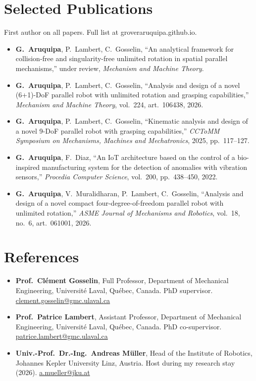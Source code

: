 \documentclass[10pt,letterpaper]{article}
\begin{document}
\section{Selected Publications}
{\small First author on all papers. Full list at groveraruquipa.github.io.}\par\vspace{2pt}
\begin{itemize}
\item \textbf{G.~Aruquipa}, P.~Lambert, C.~Gosselin, ``An analytical framework for collision-free and singularity-free unlimited rotation in spatial parallel mechanisms,'' under review, \emph{Mechanism and Machine Theory}.
\item \textbf{G.~Aruquipa}, P.~Lambert, C.~Gosselin, ``Analysis and design of a novel (6+1)-DoF parallel robot with unlimited rotation and grasping capabilities,'' \emph{Mechanism and Machine Theory}, vol.~224, art.~106438, 2026.
\item \textbf{G.~Aruquipa}, P.~Lambert, C.~Gosselin, ``Kinematic analysis and design of a novel 9-DoF parallel robot with grasping capabilities,'' \emph{CCToMM Symposium on Mechanisms, Machines and Mechatronics}, 2025, pp.~117--127.
\item \textbf{G.~Aruquipa}, F.~Diaz, ``An IoT architecture based on the control of a bio-inspired manufacturing system for the detection of anomalies with vibration sensors,'' \emph{Procedia Computer Science}, vol.~200, pp.~438--450, 2022.
\item \textbf{G.~Aruquipa}, V.~Muralidharan, P.~Lambert, C.~Gosselin, ``Analysis and design of a novel compact four-degree-of-freedom parallel robot with unlimited rotation,'' \emph{ASME Journal of Mechanisms and Robotics}, vol.~18, no.~6, art.~061001, 2026.
\end{itemize}

\section{References}
\begin{itemize}
\item \textbf{Prof.~Cl\'ement Gosselin}, Full Professor, Department of Mechanical Engineering, Universit\'e Laval, Qu\'ebec,
Canada. PhD supervisor. \href{mailto:clement.gosselin@gmc.ulaval.ca}{clement.gosselin@gmc.ulaval.ca}
\item \textbf{Prof.~Patrice Lambert}, Assistant Professor, Department of Mechanical Engineering, Universit\'e Laval,
Qu\'ebec, Canada. PhD co-supervisor. \href{mailto:patrice.lambert@gmc.ulaval.ca}{patrice.lambert@gmc.ulaval.ca}
\item \textbf{Univ.-Prof.~Dr.-Ing.~Andreas M\"uller}, Head of the Institute of Robotics, Johannes Kepler University Linz,
Austria. Host during my research stay (2026). \href{mailto:a.mueller@jku.at}{a.mueller@jku.at}
\end{itemize}
\end{document}
